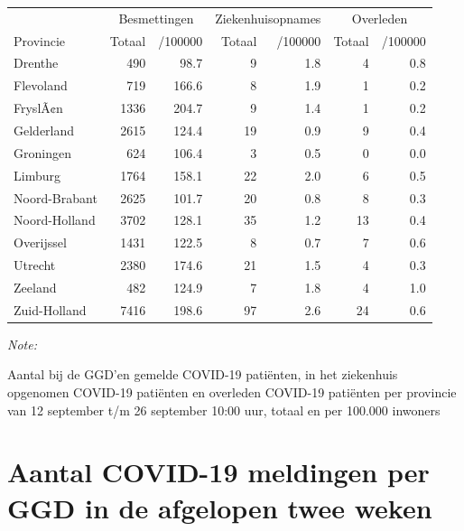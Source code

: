 \documentclass[
  english,
  man,floatsintext]{apa6}
\begin{document}
\begin{table}
\centering
\begin{threeparttable}
\begin{tabular}{lrrrrrr}
\toprule
\multicolumn{1}{c}{ } & \multicolumn{2}{c}{Besmettingen} & \multicolumn{2}{c}{Ziekenhuisopnames} & \multicolumn{2}{c}{Overleden} \\
\cmidrule(l{3pt}r{3pt}){2-3} \cmidrule(l{3pt}r{3pt}){4-5} \cmidrule(l{3pt}r{3pt}){6-7}
Provincie & Totaal & /100000 & Totaal & /100000 & Totaal & /100000\\
\midrule
Drenthe & 490 & 98.7 & 9 & 1.8 & 4 & 0.8\\
Flevoland & 719 & 166.6 & 8 & 1.9 & 1 & 0.2\\
FryslÃ¢n & 1336 & 204.7 & 9 & 1.4 & 1 & 0.2\\
Gelderland & 2615 & 124.4 & 19 & 0.9 & 9 & 0.4\\
Groningen & 624 & 106.4 & 3 & 0.5 & 0 & 0.0\\
Limburg & 1764 & 158.1 & 22 & 2.0 & 6 & 0.5\\
Noord-Brabant & 2625 & 101.7 & 20 & 0.8 & 8 & 0.3\\
Noord-Holland & 3702 & 128.1 & 35 & 1.2 & 13 & 0.4\\
Overijssel & 1431 & 122.5 & 8 & 0.7 & 7 & 0.6\\
Utrecht & 2380 & 174.6 & 21 & 1.5 & 4 & 0.3\\
Zeeland & 482 & 124.9 & 7 & 1.8 & 4 & 1.0\\
Zuid-Holland & 7416 & 198.6 & 97 & 2.6 & 24 & 0.6\\
\bottomrule
\end{tabular}
\begin{tablenotes}
\item \textit{Note: } 
\item Aantal bij de GGD’en gemelde COVID-19 patiënten, in het ziekenhuis opgenomen COVID-19 patiënten en overleden COVID-19 patiënten per provincie van 12 september t/m 26 september 10:00 uur, totaal en per 100.000 inwoners
\end{tablenotes}
\end{threeparttable}
\end{table}

\newpage

\hypertarget{aantal-covid-19-meldingen-per-ggd-in-de-afgelopen-twee-weken}{%
\section{Aantal COVID-19 meldingen per GGD in de afgelopen twee weken}\label{aantal-covid-19-meldingen-per-ggd-in-de-afgelopen-twee-weken}}
\end{document}
